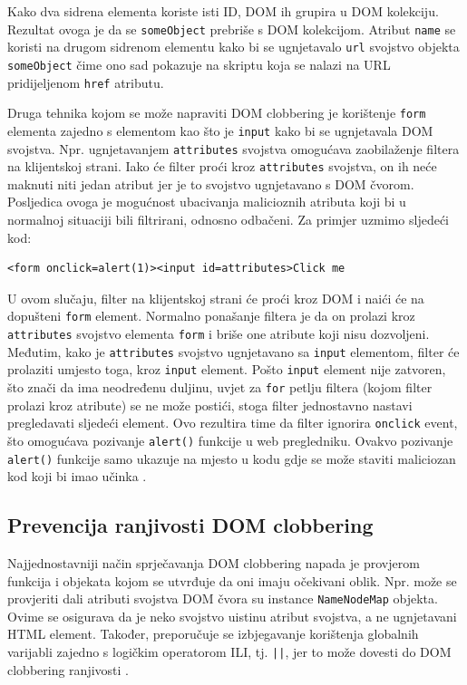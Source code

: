 \documentclass[12pt, oneside, onecolumn]{book}
\begin{document}
{Kako dva sidrena elementa koriste isti ID, DOM ih grupira u DOM kolekciju. Rezultat ovoga je da se \texttt{someObject} prebriše s DOM kolekcijom. Atribut \texttt{name} se koristi na drugom sidrenom elementu kako bi se ugnjetavalo \texttt{url} svojstvo objekta \texttt{someObject} čime ono sad pokazuje na skriptu koja se nalazi na URL pridijeljenom \texttt{href} atributu.

Druga tehnika kojom se može napraviti DOM clobbering je korištenje \texttt{form} elementa zajedno s elementom kao što je \texttt{input} kako bi se ugnjetavala DOM svojstva. Npr. ugnjetavanjem \texttt{attributes} svojstva omogućava zaobilaženje filtera na klijentskoj strani. Iako će filter proći kroz \texttt{attributes} svojstva, on ih neće maknuti niti jedan atribut jer je to svojstvo ugnjetavano s DOM čvorom. Posljedica ovoga je mogućnost ubacivanja malicioznih atributa koji bi u normalnoj situaciji bili filtrirani, odnosno odbačeni. Za primjer uzmimo sljedeći kod:

\begin{verbatim}
<form onclick=alert(1)><input id=attributes>Click me
\end{verbatim}

U ovom slučaju, filter na klijentskoj strani će proći kroz DOM i naići će na dopušteni \texttt{form} element. Normalno ponašanje filtera je da on prolazi kroz \texttt{attributes} svojstvo elementa \texttt{form} i briše one atribute koji nisu dozvoljeni. Međutim, kako je \texttt{attributes} svojstvo ugnjetavano sa \texttt{input} elementom, filter će prolaziti umjesto toga, kroz \texttt{input} element. Pošto \texttt{input} element nije zatvoren, što znači da ima neodređenu duljinu, uvjet za \texttt{for} petlju filtera (kojom filter prolazi kroz atribute) se ne može postići, stoga filter jednostavno nastavi pregledavati sljedeći element. Ovo rezultira time da filter ignorira \texttt{onclick} event, što omogućava pozivanje \texttt{alert()} funkcije u web pregledniku. Ovakvo pozivanje \texttt{alert()} funkcije samo ukazuje na mjesto u kodu gdje se može staviti maliciozan kod koji bi imao učinka \cite{domnapad}.

\subsection{Prevencija ranjivosti DOM clobbering}
Najjednostavniji način sprječavanja DOM clobbering napada je provjerom funkcija i objekata kojom se utvrđuje da oni imaju očekivani oblik. Npr. može se provjeriti dali atributi svojstva DOM čvora su instance \texttt{NameNodeMap} objekta. Ovime se osigurava da je neko svojstvo uistinu atribut svojstva, a ne ugnjetavani HTML element. Također, preporučuje se izbjegavanje korištenja globalnih varijabli zajedno s logičkim operatorom ILI, tj. \texttt{||}, jer to može dovesti do DOM clobbering ranjivosti \cite{domclob}.

}
\end{document}
